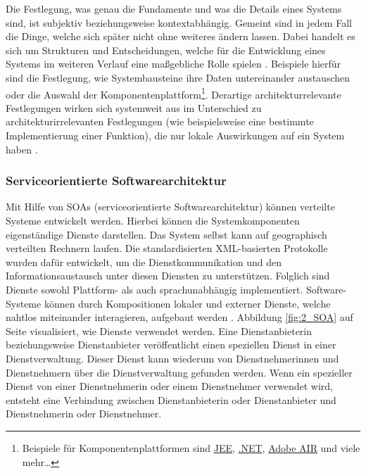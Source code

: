 Die Festlegung, was genau die Fundamente und was die Details eines Systems sind, ist subjektiv beziehungsweise kontextabhängig. Gemeint sind in jedem Fall die Dinge, welche sich später nicht ohne weiteres ändern lassen. Dabei handelt es sich um Strukturen und Entscheidungen, welche für die Entwicklung eines Systems im weiteren Verlauf eine maßgebliche Rolle spielen \citereset \autocite[siehe][]{Fowler.2005}. Beispiele hierfür sind die Festlegung, wie Systembausteine ihre Daten untereinander austauschen oder die Auswahl der Komponentenplattform\footnote{Beispiele für Komponentenplattformen sind \href{http://www.oracle.com/technetwork/java/javaee}{JEE}, \href{http://www.microsoft.com/net}{.NET}, \href{http://www.adobe.com/at/products/air.html}{Adobe AIR} und viele mehr\ldots }. Derartige architekturrelevante Festlegungen wirken sich systemweit aus im Unterschied zu architekturirrelevanten Festlegungen (wie beispielsweise eine bestimmte Implementierung einer Funktion), die nur lokale Auswirkungen auf ein System haben \citereset \autocite[siehe][]{Bredemeyer.Malan.2004}.

\subsubsection{Serviceorientierte Softwarearchitektur}
\label{sec:2_Serviceorientierte_Softwarearchitektur}
Mit Hilfe von SOAs (serviceorientierte Softwarearchitektur) können verteilte Systeme entwickelt werden. Hierbei können die Systemkomponenten eigenständige Dienste darstellen. Das System selbst kann auf geographisch verteilten Rechnern laufen. Die standardisierten XML-basierten Protokolle wurden dafür entwickelt, um die Dienstkommunikation und den Informationsaustausch unter diesen Diensten zu unterstützen. Folglich sind Dienste sowohl Plattform- als auch sprachunabhängig implementiert. Software-Systeme können durch Kompositionen lokaler und externer Dienste, welche nahtlos miteinander interagieren, aufgebaut werden \citereset \autocite[siehe][S. 509-514]{Sommerville.2011}. Abbildung \ref{fig:2_SOA} auf Seite \pageref{fig:2_SOA} visualisiert, wie Dienste verwendet werden. Eine Dienstanbieterin beziehungsweise Dienstanbieter veröffentlicht einen speziellen Dienst in einer Dienstverwaltung. Dieser Dienst kann wiederum von Dienstnehmerinnen und Dienstnehmern über die Dienstverwaltung gefunden werden. Wenn ein spezieller Dienst von einer Dienstnehmerin oder einem Dienstnehmer verwendet wird, entsteht eine Verbindung zwischen Dienstanbieterin oder Dienstanbieter und Dienstnehmerin oder Dienstnehmer.

